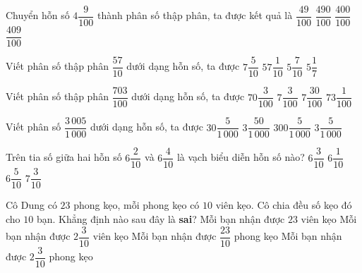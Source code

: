 \begin{ex} %
Chuyển hỗn số $4\dfrac{9}{100}$ thành phân số thập phân, ta được kết quả là
\choice
{$\dfrac{49}{100}$}
{$\dfrac{490}{100}$}
{$\dfrac{400}{100}$}
{\True $\dfrac{409}{100}$}
\end{ex}

\begin{ex} %
Viết phân số thập phân $\dfrac{57}{10}$ dưới dạng hỗn số, ta được
\choice
{$7\dfrac{5}{10}$}
{$57\dfrac{1}{10}$}
{\True $5\dfrac{7}{10}$}
{$5\dfrac{1}{7}$}
\end{ex}

\begin{ex} %
Viết phân số thập phân $\dfrac{703}{100}$ dưới dạng hỗn số, ta được
\choice
{$70\dfrac{3}{100}$}
{\True $7\dfrac{3}{100}$}
{$7\dfrac{30}{100}$}
{$73\dfrac{1}{100}$}
\end{ex}

\begin{ex} %
Viết phân số $\dfrac{3\,005}{1\,000}$ dưới dạng hỗn số, ta được
\choice
{$30\dfrac{5}{1\,000}$}
{$3\dfrac{50}{1\,000}$}
{$300\dfrac{5}{1\,000}$}
{\True $3\dfrac{5}{1\,000}$}
\end{ex}

\begin{ex} %
Trên tia số giữa hai hỗn số $6\dfrac{2}{10}$ và $6\dfrac{4}{10}$ là vạch biểu diễn hỗn số nào?
\choice
{\True $6\dfrac{3}{10}$}
{$6\dfrac{1}{10}$}
{$6\dfrac{5}{10}$}
{$7\dfrac{3}{10}$}
\end{ex}

\begin{ex} %
Cô Dung có $23$ phong kẹo, mỗi phong kẹo có $10$ viên kẹo. Cô chia đều số kẹo đó cho $10$ bạn. Khẳng định nào sau đây là \textbf{sai}?
\choice
{Mỗi bạn nhận được $23$ viên kẹo}
{\True Mỗi bạn nhận được $2\dfrac{3}{10}$ viên kẹo}
{Mỗi bạn nhận được $\dfrac{23}{10}$ phong kẹo}
{Mỗi bạn nhận được $2\dfrac{3}{10}$ phong kẹo}
\end{ex}


